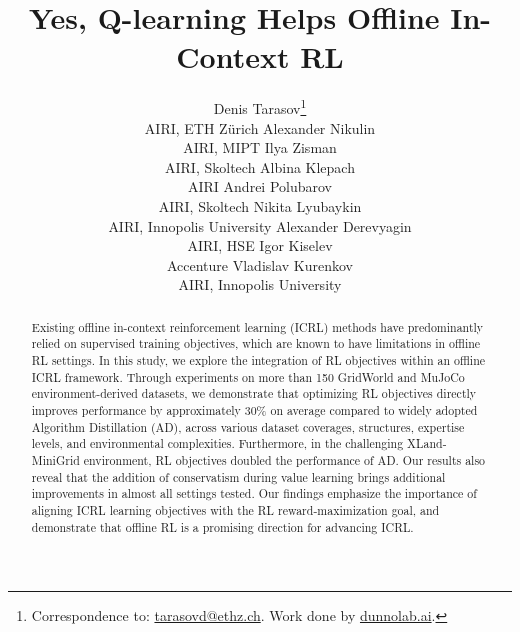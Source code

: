 \documentclass{article}
\title{Yes, Q-learning Helps Offline In-Context RL}
\author{
Denis Tarasov\thanks{Correspondence to: \href{mailto:tarasovd@ethz.ch}{tarasovd@ethz.ch}. Work done by \href{https://dunnolab.ai}{dunnolab.ai}.} \\ AIRI, ETH Zürich \And
Alexander Nikulin \\ AIRI, MIPT \And
Ilya Zisman \\ AIRI, Skoltech \And
Albina Klepach \\ AIRI \And
Andrei Polubarov \\ AIRI, Skoltech \And
Nikita Lyubaykin \\ AIRI, Innopolis University \And
Alexander Derevyagin \\ AIRI, HSE \And
Igor Kiselev \\ Accenture \And
Vladislav Kurenkov \\ AIRI, Innopolis University
}
\begin{document}
\maketitle
\begin{abstract}
Existing offline in-context reinforcement learning (ICRL) methods have predominantly relied on supervised training objectives, which are known to have limitations in offline RL settings. In this study, we explore the integration of RL objectives within an offline ICRL framework. Through experiments on more than 150 GridWorld and MuJoCo environment-derived datasets, we demonstrate that optimizing RL objectives directly improves performance by approximately 30\% on average compared to widely adopted Algorithm Distillation (AD), across various dataset coverages, structures, expertise levels, and environmental complexities. Furthermore, in the challenging XLand-MiniGrid environment, RL objectives doubled the performance of AD. Our results also reveal that the addition of conservatism during value learning brings additional improvements in almost all settings tested. Our findings emphasize the importance of aligning ICRL learning objectives with the RL reward-maximization goal, and demonstrate that offline RL is a promising direction for advancing ICRL.
\end{abstract}
\end{document}

